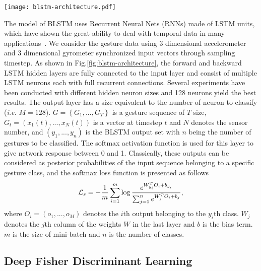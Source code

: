 \documentclass[review]{elsarticle}
\begin{document}
\begin{figure*}
	\centering
\texttt{[image: blstm-architecture.pdf]}
\caption{{The architecture of F-BLSTM. We intuitively change the loss function of BLSTM, and the resulting algorithm does not affect the training convergence and the model size, but leading to a performance improvement.}}
	\label{fig:blstm-architecture}
\end{figure*}

The model of {BLSTM uses Recurrent Neural Nets (RNNs)} made of LSTM units, which have shown the great ability to deal with temporal data in many applications~\cite{sundermeyer2012lstm}. We consider the gesture data using 3 dimensional accelerometer and 3 dimensional gyrometer synchronized input vectors through sampling timestep. As shown in Fig.\;\ref{fig:blstm-architecture}, the forward and backward LSTM hidden layers are fully connected to the input layer and consist of multiple LSTM neurons each with full recurrent connections. Several experiments have been conducted with different hidden neuron sizes and 128 neurons yield the best results. The output layer has a size equivalent to the number of neuron to classify (\emph{i.e.} $M=128$). $G = \left\{ {G_1,...,G_{T}} \right\}$ is a gesture sequence of $T$ size, $G_t = \left(x_1\left(t\right),...,x_{N}\left(t\right)\right)$ is a vector at timestep $t$ and $N$ denotes the sensor number, and $\left(y_1,...,y_{n}\right)$ is the BLSTM output set with $n$ being the number of gestures to be classified. The softmax activation function is used for this layer to give network response between 0 and 1. Classically, these outputs can be considered as posterior probabilities of the input sequence belonging to a specific gesture class, and the softmax loss function is presented as follows
\begin{equation}
	{\cal L}_s =  - \frac{1}{m} \sum\limits_{i = 1}^m \log \frac{{{e^{W_{{y_i}}^T{O_i} + {b_{{y_{i}}}}}}}}{{\sum\nolimits_{j = 1}^n {{e^{W_j^T{O_i} + {b_j}}}} }},
	\label{eq:softmaxloss}
\end{equation}
where $O_i =\left(o_1,...,o_M\right)$ denotes the {$i$th output belonging to the $y_i$th class}. $W_j$ denotes the $j$th column of the weights $W$ in the last layer and $b$ is the bias term. $m$ is the size of mini-batch and $n$ is the number of classes.




\subsection{Deep Fisher Discriminant Learning }\label{sec:fisherloss}
\end{document}
